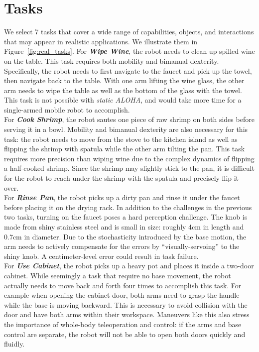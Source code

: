 \documentclass[11pt, a4paper, logo, twocolumn]{stanford}
\newcommand{\staticalohacomma}{\textit{static ALOHA}}
\begin{document}
\section{Tasks}
\label{subsec:tasks}
We select 7 tasks that cover a wide range of capabilities, objects, and interactions that may appear in realistic applications. We illustrate them in Figure~\ref{fig:real_tasks}.
For \textbf{\textit{Wipe Wine}}, the robot needs to clean up spilled wine on the table. This task requires both mobility and bimanual dexterity. Specifically, the robot needs to first navigate to the faucet and pick up the towel, then navigate back to the table. With one arm lifting the wine glass, the other arm needs to wipe the table as well as the bottom of the glass with the towel. This task is not possible with \staticalohacomma, and would take more time for a single-armed mobile robot to accomplish.\\
For \textbf{\textit{Cook Shrimp}}, the robot sautes one piece of raw shrimp on both sides before serving it in a bowl. Mobility and bimanual dexterity are also necessary for this task: the robot needs to move from the stove to the kitchen island as well as flipping the shrimp with spatula while the other arm tilting the pan. This task requires more precision than wiping wine due to the complex dynamics of flipping a half-cooked shrimp. 
Since the shrimp may slightly stick to the pan, it is difficult for the robot to reach under the shrimp with the spatula and precisely flip it over.\\
For \textbf{\textit{Rinse Pan}},
the robot picks up a dirty pan and rinse it under the faucet before placing it on the drying rack. In addition to the challenges in the previous two tasks, turning on the faucet poses a hard perception challenge. The knob is made from shiny stainless steel and is small in size: roughly 4cm in length and 0.7cm in diameter. Due to the stochasticity introduced by the base motion, the arm needs to actively compensate for the errors by ``visually-servoing'' to the shiny knob. A centimeter-level error could result in task failure.\\
For \textbf{\textit{Use Cabinet}}, the robot picks up a heavy pot and places it inside a two-door cabinet. While seemingly a task that require no base movement, the robot actually needs to move back and forth four times to accomplish this task. For example when opening the cabinet door, both arms need to grasp the handle while the base is moving backward. This is necessary to avoid collision with the door and have both arms within their workspace. Maneuvers like this also stress the importance of whole-body teleoperation and control: if the arms and base control are separate, the robot will not be able to open both doors quickly and fluidly. 
\end{document}
